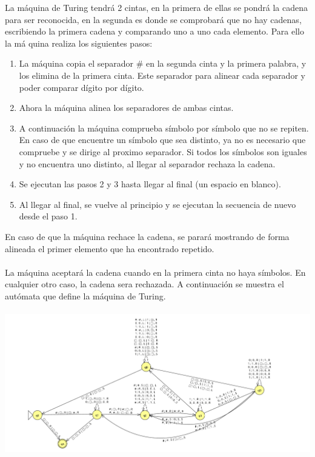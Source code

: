 \documentclass[11pt, a4paper]{exam}
\begin{document}
\begin{questions}
\begin{parts}
\begin{solution}
            La máquina de Turing tendrá 2 cintas, en la primera de ellas se pondrá la cadena para ser reconocida, en la segunda es donde se comprobará que no hay cadenas, escribiendo la primera cadena y comparando uno a uno cada elemento. Para ello la má
            quina realiza los siguientes pasos:
            \begin{enumerate}
                \item La máquina copia el separador $\#$ en la segunda cinta y la primera palabra, y los elimina de la primera cinta. Este separador para alinear cada separador y poder comparar dígito por dígito.
                \item Ahora la máquina alinea los separadores de ambas cintas.
                \item A continuación la máquina comprueba símbolo por símbolo que no se repiten. En caso de que encuentre un símbolo que sea distinto, ya no es necesario que compruebe y se dirige al proximo separador. Si todos los símbolos son iguales y no encuentra uno distinto, al llegar al separador rechaza la cadena.
                \item Se ejecutan las pasos 2 y 3 hasta llegar al final (un espacio en blanco).
                \item Al llegar al final, se vuelve al principio y se ejecutan la secuencia de nuevo desde el paso 1.
            \end{enumerate}
            En caso de que la máquina rechace la cadena, se parará mostrando de forma alineada el primer elemento que ha encontrado repetido.
            \\
            \\
            La máquina aceptará la cadena cuando en la primera cinta no haya símbolos. En cualquier otro caso, la cadena sera rechazada.
            A continuación se muestra el autómata que define la máquina de Turing. 
            \\
            \\
            \includegraphics[width = 16 cm]{figs/M4Multicinta.png}

\end{solution}
\end{parts}
\end{questions}
\end{document}
